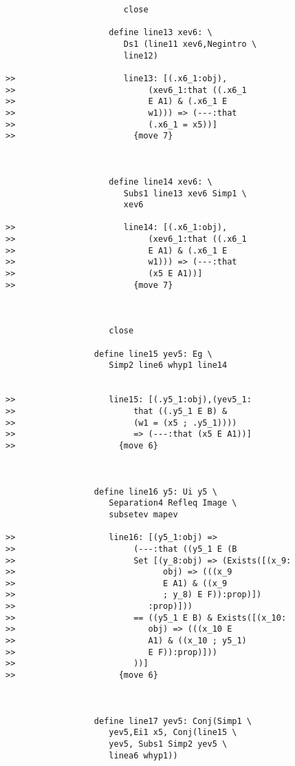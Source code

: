 \documentclass[12pt]{article}
\begin{document}
\begin{verbatim}
                        close

                     define line13 xev6: \
                        Ds1 (line11 xev6,Negintro \
                        line12)

>>                      line13: [(.x6_1:obj),
>>                           (xev6_1:that ((.x6_1
>>                           E A1) & (.x6_1 E
>>                           w1))) => (---:that
>>                           (.x6_1 = x5))]
>>                        {move 7}



                     define line14 xev6: \
                        Subs1 line13 xev6 Simp1 \
                        xev6

>>                      line14: [(.x6_1:obj),
>>                           (xev6_1:that ((.x6_1
>>                           E A1) & (.x6_1 E
>>                           w1))) => (---:that
>>                           (x5 E A1))]
>>                        {move 7}



                     close

                  define line15 yev5: Eg \
                     Simp2 line6 whyp1 line14


>>                   line15: [(.y5_1:obj),(yev5_1:
>>                        that ((.y5_1 E B) &
>>                        (w1 = (x5 ; .y5_1))))
>>                        => (---:that (x5 E A1))]
>>                     {move 6}



                  define line16 y5: Ui y5 \
                     Separation4 Refleq Image \
                     subsetev mapev

>>                   line16: [(y5_1:obj) =>
>>                        (---:that ((y5_1 E (B
>>                        Set [(y_8:obj) => (Exists([(x_9:
>>                              obj) => (((x_9
>>                              E A1) & ((x_9
>>                              ; y_8) E F)):prop)])
>>                           :prop)]))
>>                        == ((y5_1 E B) & Exists([(x_10:
>>                           obj) => (((x_10 E
>>                           A1) & ((x_10 ; y5_1)
>>                           E F)):prop)]))
>>                        ))]
>>                     {move 6}



                  define line17 yev5: Conj(Simp1 \
                     yev5,Ei1 x5, Conj(line15 \
                     yev5, Subs1 Simp2 yev5 \
                     linea6 whyp1))


\end{verbatim}
\end{document}
